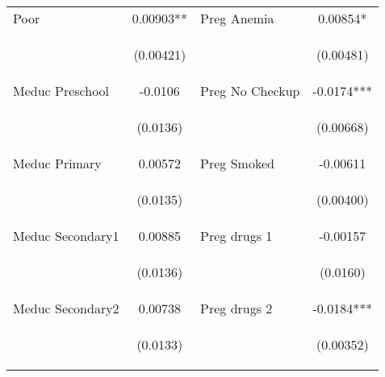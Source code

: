 \begin{table}[htpb!]
\begin{center}
\begin{tabular}{lclc}
Poor	&	0.00903**	&	Preg Anemia	&	0.00854*	\\
	\vspace{4pt} & \begin{footnotesize}	(0.00421)	\end{footnotesize} & \begin{footnotesize}		\end{footnotesize} & \begin{footnotesize}	(0.00481)	\end{footnotesize} \\
Meduc Preschool	&	-0.0106	&	Preg No Checkup	&	-0.0174***	\\
	\vspace{4pt} & \begin{footnotesize}	(0.0136)	\end{footnotesize} & \begin{footnotesize}		\end{footnotesize} & \begin{footnotesize}	(0.00668)	\end{footnotesize} \\
Meduc Primary	&	0.00572	&	Preg Smoked	&	-0.00611	\\
	\vspace{4pt} & \begin{footnotesize}	(0.0135)	\end{footnotesize} & \begin{footnotesize}		\end{footnotesize} & \begin{footnotesize}	(0.00400)	\end{footnotesize} \\
Meduc Secondary1	&	0.00885	&	Preg drugs 1	&	-0.00157	\\
	\vspace{4pt} & \begin{footnotesize}	(0.0136)	\end{footnotesize} & \begin{footnotesize}		\end{footnotesize} & \begin{footnotesize}	(0.0160)	\end{footnotesize} \\
Meduc Secondary2	&	0.00738	&	Preg drugs 2	&	-0.0184***	\\
	\vspace{4pt} & \begin{footnotesize}	(0.0133)	\end{footnotesize} & \begin{footnotesize}		\end{footnotesize} & \begin{footnotesize}	(0.00352)	\end{footnotesize} \\

\end{tabular}
\end{center}
\end{table}
